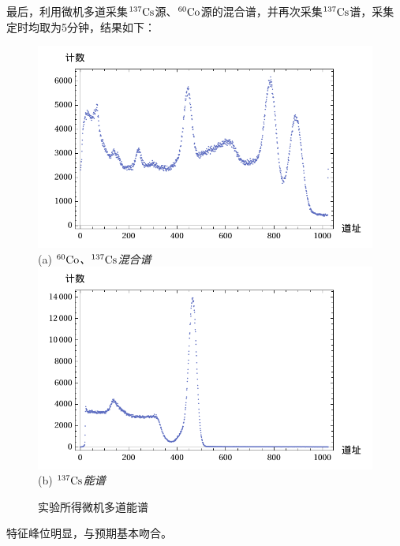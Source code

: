 \documentclass[aps,pre,12pt,preprint,%
	onecolumn,showpacs,showkeys,nofootinbib]{revtex4-1}
\newcommand{\csAtom}{${}^{137}\mrm{Cs}$}
\newcommand{\coAtom}{${}^{60}\mrm{Co}$}
\begin{document}
	最后，利用微机多道采集\csAtom 源、\coAtom 源的混合谱，并再次采集\csAtom 谱，采集定时均取为5分钟，结果如下：
	\begin{figure}[!ht]
	\vspace{-.3\baselineskip}
	\centering\small
	\includegraphics[width=.78\linewidth]{img/plots/mixedSpectrum.pdf}\\[1ex]
	(a) \textit{\coAtom、\csAtom 混合谱}\\[2ex]
	\includegraphics[width=.78\linewidth]{img/plots/csSpectrum.pdf}\\[1ex]
	(b) \textit{\csAtom 能谱}\\[1ex]
	\caption{实验所得微机多道能谱}
	\vspace{-.2\baselineskip}
	\end{figure}
\FloatBarrier\noindent
	特征峰位明显，与预期基本吻合。
	
\clearpage
\end{document}

